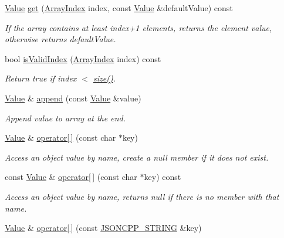 \begin{DoxyCompactItemize}
\hyperlink{classJson_1_1Value}{Value} \hyperlink{classJson_1_1Value_a28282c9b76fa031eba7a1843c47c16fe}{get} (\hyperlink{classJson_1_1Value_a184a91566cccca7b819240f0d5561c7d}{Array\+Index} index, const \hyperlink{classJson_1_1Value}{Value} \&default\+Value) const 
\begin{DoxyCompactList}\small\item\em If the array contains at least index+1 elements, returns the element value, otherwise returns default\+Value. \end{DoxyCompactList}\item 
bool \hyperlink{classJson_1_1Value_aaa82ebb4b730ea1567d310874f47d147}{is\+Valid\+Index} (\hyperlink{classJson_1_1Value_a184a91566cccca7b819240f0d5561c7d}{Array\+Index} index) const 
\begin{DoxyCompactList}\small\item\em Return true if index $<$ \hyperlink{classJson_1_1Value_a4ca8ee6c48a34ca6c2f131956bab5e05}{size()}. \end{DoxyCompactList}\item 
\hyperlink{classJson_1_1Value}{Value} \& \hyperlink{classJson_1_1Value_a7e49ac977e4bcf59745a09d426669f75}{append} (const \hyperlink{classJson_1_1Value}{Value} \&value)
\begin{DoxyCompactList}\small\item\em Append value to array at the end. \end{DoxyCompactList}\item 
\hyperlink{classJson_1_1Value}{Value} \& \hyperlink{classJson_1_1Value_acb912f4ec40a25ea6eb387730885f3d9}{operator\mbox{[}$\,$\mbox{]}} (const char $\ast$key)
\begin{DoxyCompactList}\small\item\em Access an object value by name, create a null member if it does not exist. \end{DoxyCompactList}\item 
const \hyperlink{classJson_1_1Value}{Value} \& \hyperlink{classJson_1_1Value_ae5f73ffc7a039bca81b7ca771bc5db55}{operator\mbox{[}$\,$\mbox{]}} (const char $\ast$key) const 
\begin{DoxyCompactList}\small\item\em Access an object value by name, returns null if there is no member with that name. \end{DoxyCompactList}\item 
\hyperlink{classJson_1_1Value}{Value} \& \hyperlink{classJson_1_1Value_aedd1e152756a4cc8c1ebac0dd7aeeb78}{operator\mbox{[}$\,$\mbox{]}} (const \hyperlink{json_8hpp_a1e723f95759de062585bc4a8fd3fa4be}{J\+S\+O\+N\+C\+P\+P\+\_\+\+S\+T\+R\+I\+NG} \&key)

\end{DoxyCompactItemize}
